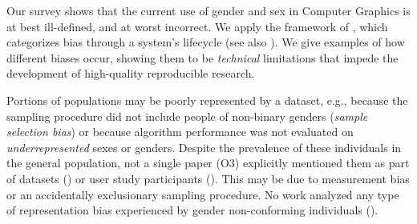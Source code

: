 \documentclass[sigconf,balance=false]{acmart}
\begin{document}
Our survey shows that the current use of gender and sex in Computer Graphics is at best ill-defined, and at worst incorrect.
We apply the framework of \citet{Suresh2021}, which categorizes bias through a system's lifecycle 
(see also \cite{fairnesssurvey,FriedmanAndNissenbaum,olteanu2019social}).
We give examples of how different biases occur, showing them to be \emph{technical} limitations that impede the development of high-quality reproducible research.

 Portions of populations may be poorly represented by a dataset, e.g., because the sampling procedure did not include people of non-binary genders (\emph{sample selection bias}) or because algorithm performance was not evaluated on \emph{underrepresented} sexes or genders. Despite the prevalence of these individuals in the general population, not a single paper (O3) explicitly mentioned them as part of datasets (\dataset) or user study participants (\userstudy). 
This may be due to measurement bias or an accidentally exclusionary sampling procedure. No work analyzed any type of representation bias experienced by gender non-conforming individuals (\binary).
\end{document}
